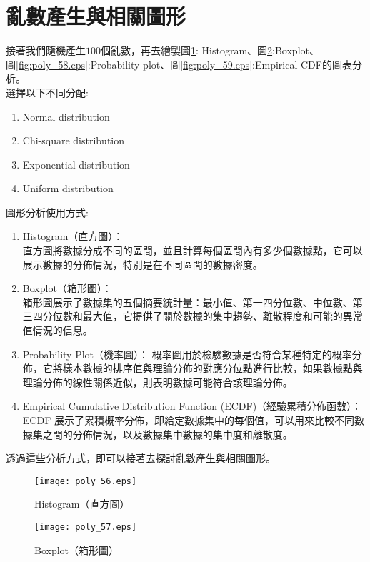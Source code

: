 \documentclass[12pt, a4paper]{article}
\begin{document}
\section{亂數產生與相關圖形}
接著我們隨機產生\;$100$\;個亂數，再去繪製圖\;\ref{fig:poly_56.eps}\;:\; Histogram、\;圖\;\ref{fig:poly_57.eps}\;:\;Boxplot、\\
\;圖\;\ref{fig:poly_58.eps}\;:\;Probability plot、\;圖\;\ref{fig:poly_59.eps}\;:\;Empirical CDF\;的圖表分析。\\
選擇以下不同分配\;:\;
\begin{enumerate}
\item Normal distribution
\item Chi-square distribution
\item Exponential distribution
\item Uniform distribution
\end{enumerate}
圖形分析使用方式\;:
\begin{enumerate}
\item Histogram（直方圖）：\\
直方圖將數據分成不同的區間，並且計算每個區間內有多少個數據點，它可以展示數據的分佈情況，特別是在不同區間的數據密度。
\item Boxplot（箱形圖）：\\
箱形圖展示了數據集的五個摘要統計量：最小值、第一四分位數、中位數、第三四分位數和最大值，它提供了關於數據的集中趨勢、離散程度和可能的異常值情況的信息。
\item Probability Plot（機率圖）：
概率圖用於檢驗數據是否符合某種特定的概率分佈，它將樣本數據的排序值與理論分佈的對應分位點進行比較，如果數據點與理論分佈的線性關係近似，則表明數據可能符合該理論分佈。
\item Empirical Cumulative Distribution Function (ECDF)（經驗累積分佈函數）：\\
ECDF 展示了累積概率分佈，即給定數據集中的每個值，可以用來比較不同數據集之間的分佈情況，以及數據集中數據的集中度和離散度。
\end{enumerate}
透過這些分析方式，即可以接著去探討亂數產生與相關圖形。

\begin{figure}[h]
\centering
\texttt{[image: poly\_56.eps]}
\caption{Histogram（直方圖）}
\label{fig:poly_56.eps}
\end{figure} 

\begin{figure}[h]
\centering
\texttt{[image: poly\_57.eps]}
\caption{Boxplot（箱形圖）}
\label{fig:poly_57.eps}
\end{figure} 
\end{document}
